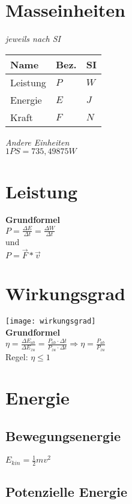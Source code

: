 \documentclass[a4paper,10pt]{article}
\begin{document}
\begin{multicols}{2}

  \section{Masseinheiten}
  \textit{jeweils nach SI}\\
  \begin{tabular}{|l|l|l|}
    \hline
    \textbf{Name} & \textbf{Bez.} & \textbf{SI} \\\hline
    Leistung & \(P\) & \(W\)\\\hline
    Energie & \(E\) & \(J\) \\\hline
    Kraft & \(F\) & \(N\)\\\hline
  \end{tabular}

  \textit{Andere Einheiten}\\
  \(1 PS = 735,49875 W\)\\


  \section{Leistung}
  \textbf{Grundformel}\\
  \(P = \frac{\Delta E}{\Delta t} = \frac{\Delta W}{\Delta t} \)\\
  und\\
  \(P = \vec{F} * \vec{v}\)

  \section{Wirkungsgrad}
  \texttt{[image: wirkungsgrad]}\\
  \textbf{Grundformel}\\
  \(\eta = \frac{{\Delta {E_{ab}}}}{{\Delta {E_{zu}}}} = \frac{{{P_{ab}} \cdot \Delta t}}{{{P_{zu}} \cdot \Delta t}} \Rightarrow \eta = \frac{{{P_{ab}}}}{{{P_{zu}}}}\)
  \\
  Regel: \(\eta \leq 1\)
  \section{Energie}
  \subsection{Bewegungsenergie}

  \(E_{kin} = \frac{1}{2} mv^2\)

  \subsection{Potenzielle Energie}


\end{multicols}
\end{document}
